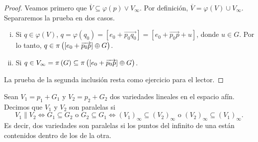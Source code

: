 \begin{proof}
  Veamos primero que $\overline{V} \subseteq \varphi(p) \vee V_\infty$. Por definición,
  $\overline{V} = \varphi(V) \cup V_\infty$. Separaremos la prueba en dos casos.
  \begin{enumerate}[i)]
    \item Si $q \in \varphi(V)$, $q = \varphi(q_0) = [e_0 + \overrightarrow{p_0q_0}]
        = [e_0 + \overrightarrow{p_0p}+u]$, donde $u \in G$. Por lo tanto,
        $q \in \pi \left([e_0 + \overrightarrow{p_0p}] \oplus G \right)$.
      \item Si $q \in V_\infty = \pi \left( G \right) \subseteq \pi \left( [e_0 + \overrightarrow{p_0
        p}] \oplus G \right)$.
  \end{enumerate}
  
  La prueba de la segunda inclusión resta como ejercicio para el lector.
\end{proof}

\begin{obs}
Sean $V_1 = p_1 + G_1$ y $V_2 = p_2 + G_2$ dos variedades lineales en el espacio afín.
Decimos que $V_1$ y $V_2$ son paralelas si
\[
  V_1 \parallel V_2 \iff G_1 \subseteq G_2 \text{ o } G_2 \subseteq G_1 \iff
  (V_1)_\infty \subseteq (V_2)_\infty \text{ o } (V_2)_\infty \subseteq (V_1)_\infty.
\]
Es decir, dos variedades son paralelas si los puntos del infinito de una están 
contenidos dentro de los de la otra.
\end{obs}

